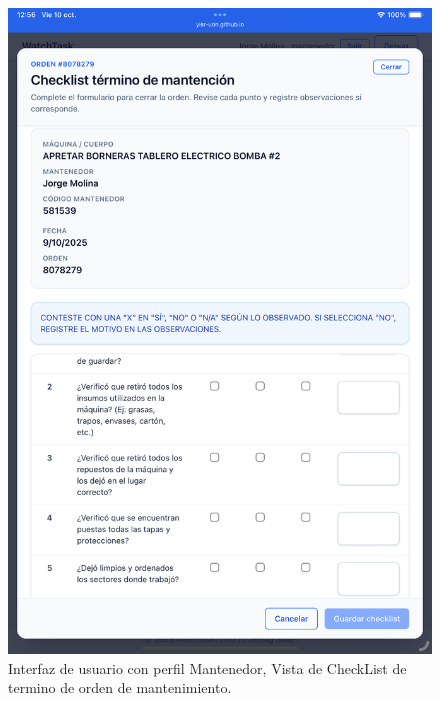 \documentclass[12pt,a4paper]{report}
\begin{document}
\begin{figure}[h]
    \centering
    \includegraphics[width=1\textwidth]{data/Mantenedor_Checklist.png}
    \caption[\,Mantenedor: Checklist de término]{Interfaz de usuario con perfil Mantenedor, Vista de CheckList de termino de orden de mantenimiento.}
    \label{fig:[Mantenedor_ChechList]}
\end{figure}
\end{document}
